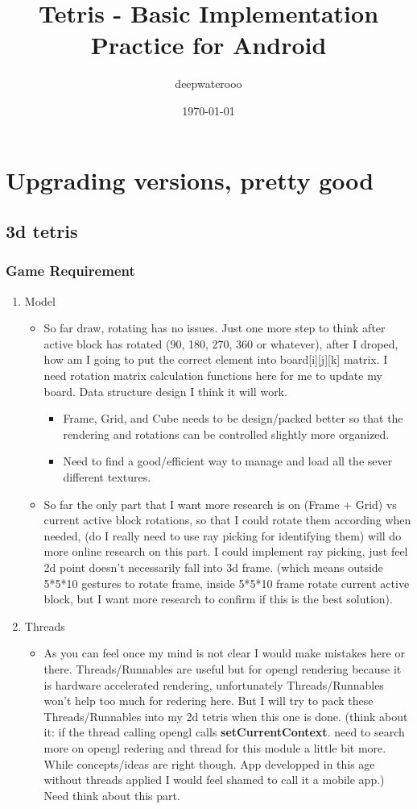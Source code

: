 \documentclass[9pt,b5paper]{article}
\author{deepwaterooo}
\date{\today}
\title{Tetris - Basic Implementation Practice for Android}
\begin{document}
\maketitle
\tableofcontents


\section{Upgrading versions, pretty good}
\label{sec-1}
\subsection{3d tetris}
\label{sec-1-1}
\subsubsection{Game Requirement}
\label{sec-1-1-1}
\begin{enumerate}
\item Model
\label{sec-1-1-1-1}
\begin{itemize}
\item So far draw, rotating has no issues. Just one more step to think after active block has rotated (90, 180, 270, 360 or whatever), after I droped, how am I going to put the correct element into board[i][j][k] matrix. I need rotation matrix calculation functions here for me to update my board. Data structure design I think it will work.
\begin{itemize}
\item Frame, Grid, and Cube needs to be design/packed better so that the rendering and rotations can be controlled slightly more organized.
\item Need to find a good/efficient way to manage and load all the sever different textures.
\end{itemize}
\item So far the only part that I want more research is on (Frame + Grid) vs current active block rotations, so that I could rotate them according when needed, (do I really need to use ray picking for identifying them) will do more online research on this part. I could implement ray picking, just feel 2d point doesn't necessarily fall into 3d frame. (which means outside 5*5*10 gestures to rotate frame, inside 5*5*10 frame rotate current active block, but I want more research to confirm if this is the best solution).
\end{itemize}
\item Threads
\label{sec-1-1-1-2}
\begin{itemize}
\item As you can feel once my mind is not clear I would make mistakes here or there. Threads/Runnables are useful but for opengl rendering because it is hardware accelerated rendering, unfortunately Threads/Runnables won't help too much for redering here. But I will try to pack these Threads/Runnables into my 2d tetris when this one is done. (think about it: if the thread calling opengl calls \textbf{setCurrentContext}. need to search more on opengl redering and thread for this module a little bit more. While concepts/ideas are right though. App developped in this age without threads applied I would feel shamed to call it a mobile app.) Need think about this part.

\end{itemize}
\end{enumerate}
\end{document}
